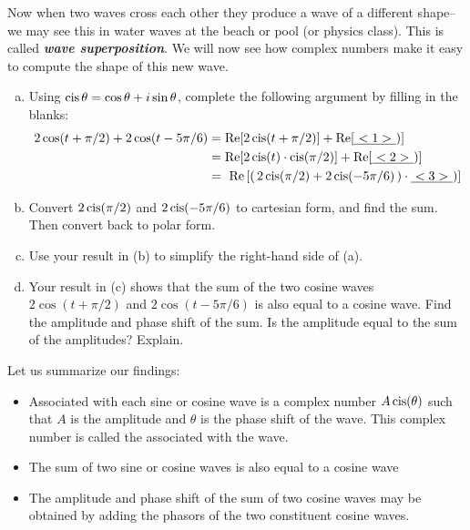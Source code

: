 Now when two waves cross each other they produce a wave of a different shape--we may see this in water waves at the beach or pool (or physics class). This is called {\bf \emph{wave superposition}}. We will now see how complex numbers make it easy to compute the shape of this new wave.

\begin{exercise}{45}
\begin{enumerate}[(a)]
\item
Using $\operatorname{cis} \theta = \cos \theta + i\sin \theta$, complete the following argument by filling in the blanks:
\begin{align*} 
2 \cos(t + \pi/2) + 2 \cos(t - 5\pi/6) &= \text{Re}[2 \operatorname{cis} (t + \pi/2)] + \text{Re}[\underline{~<1>~})]\\
&= \text{Re}[2 \operatorname{cis} (t) \cdot \operatorname{cis}(\pi/2)] + \textrm{Re}[\underline{~<2>~})]\\
&= \text{ Re} \left[\left(\, 2 \operatorname{cis}(\pi/2) + 2 \operatorname{cis}(-5\pi/6) \, \right) \cdot \underline{~<3>~}) \right] 
\end{align*}
\item
Convert $2 \operatorname{cis}(\pi/2)$ and $2 \operatorname{cis}(-5\pi/6)$ to cartesian form, and find the sum. Then convert back to polar form.
\item
Use your result in (b) to simplify the right-hand side of (a).
\item
Your result in (c) shows that the sum of the two cosine waves  $2\cos(t + \pi/2)$ and $2 \cos(t - 5\pi/6)$ is also equal to a cosine wave.  Find the amplitude and phase shift of the sum. Is the amplitude equal to the sum of the amplitudes? Explain.
\end{enumerate}
\end{exercise}

Let us summarize our findings:
\begin{itemize}
\item
Associated with each sine or cosine wave is a complex number $A \operatorname{cis}( \theta) $ such that $A$ is the amplitude and $\theta$ is the phase shift of the wave. This complex number is called the  associated with the wave.
\item
The sum of two sine or cosine waves is also equal to a cosine wave
\item
The amplitude and phase shift of the sum of two cosine waves may be obtained by adding the phasors of the two constituent cosine waves.
\end{itemize}

